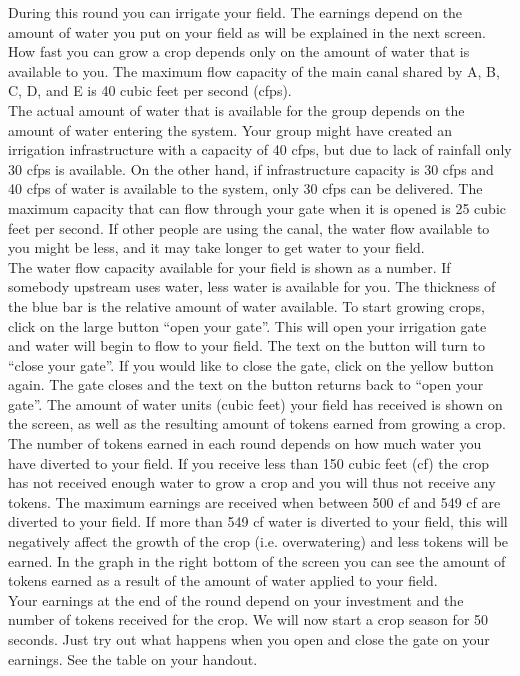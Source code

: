 \documentclass[11pt]{article}
\begin{document}
During this round you can irrigate your field. The earnings depend on
the amount of water you put on your field as will be explained in the
next screen. How fast you can grow a crop depends only on the amount
of water that is available to you. The maximum flow capacity of the
main canal shared by A, B, C, D, and E is 40 cubic feet per second
(cfps).\\

The actual amount of water that is available for the group depends on
the amount of water entering the system. Your group might have created
an irrigation infrastructure with a capacity of 40 cfps, but due to
lack of rainfall only 30 cfps is available. On the other hand, if
infrastructure capacity is 30 cfps and 40 cfps of water is available
to the system, only 30 cfps can be delivered.  The maximum capacity
that can flow through your gate when it is opened is 25 cubic feet per
second. If other people are using the canal, the water flow available
to you might be less, and it may take longer to get water to your
field.\\

The water flow capacity available for your field is shown as a number.
If somebody upstream uses water, less water is available for you. The
thickness of the blue bar is the relative amount of water available.
To start growing crops, click on the large button ``open your
gate''. This will open your irrigation gate and water will begin to
flow to your field. The text on the button will turn to ``close your
gate''. If you would like to close the gate, click on the yellow
button again. The gate closes and the text on the button returns back
to ``open your gate''.  The amount of water units (cubic feet) your
field has received is shown on the screen, as well as the resulting
amount of tokens earned from growing a crop.  The number of tokens
earned in each round depends on how much water you have diverted to
your field. If you receive less than 150 cubic feet (cf) the crop has
not received enough water to grow a crop and you will thus not receive
any tokens. The maximum earnings are received when between 500 cf and
549 cf are diverted to your field. If more than 549 cf water is
diverted to your field, this will negatively affect the growth of the
crop (i.e. overwatering) and less tokens will be earned. In the graph
in the right bottom of the screen you can see the amount of tokens
earned as a result of the amount of water
applied to your field.\\

Your earnings at the end of the round depend on your investment and
the number of tokens received for the crop. We will now start a crop
season for 50 seconds. Just try out what happens when you open and
close the gate on your earnings.  See the table on your handout.\\
\end{document}

